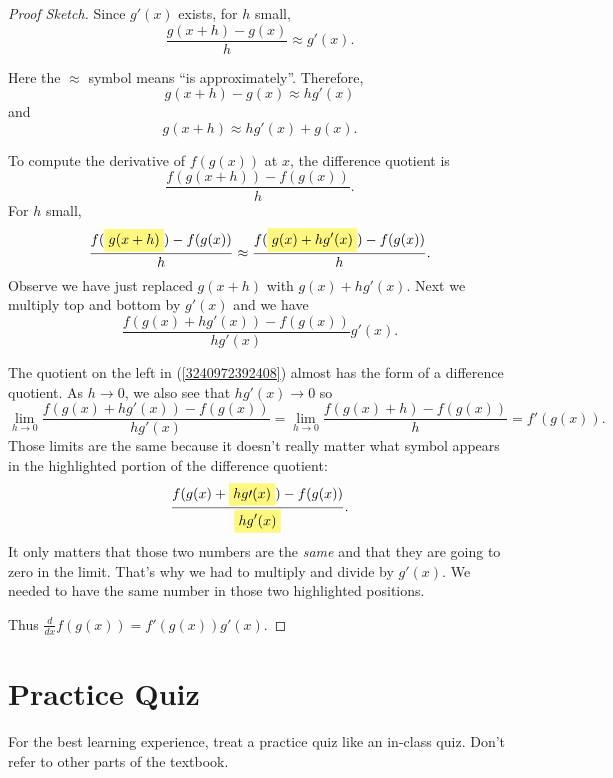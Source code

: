 \documentclass[11pt]{book}
\newcommand{\highlight}[1]{%
  \colorbox{yellow!50}{$\displaystyle#1$}}
\numberwithin{example}{chapter}
\begin{document}
\begin{proof}[Proof Sketch]

Since $g'(x)$ exists, for $h$ small, 
$$\frac{g(x+h)-g(x)}{h}\approx g'(x).$$

Here the $\approx$ symbol means ``is approximately''.  Therefore, 
$$g(x+h)-g(x)\approx hg'(x)$$
and 
$$g(x+h)\approx hg'(x)+g(x).$$

To compute the derivative of $f(g(x))$ at $x$, the difference quotient is $$\frac{f(g(x+h))-f(g(x))}{h}.$$
For $h$ small, 
$$ 
\frac{f(\highlight{g(x+h)})-f(g(x))}{h} \approx \frac{f(\highlight{g(x) + hg'(x)})-f(g(x))}{h}.$$
Observe we have just replaced $g(x+h)$ with $g(x) + hg'(x)$.  Next we multiply top and bottom by $g'(x)$ and we have 
\begin{equation} \label{3240972392408}
\frac{f(g(x) + hg'(x))-f(g(x))}{hg'(x)} g'(x).
\end{equation}

The quotient on the left in  (\ref{3240972392408}) almost has the form of a difference quotient.  As $h\to 0$, we also see that $hg'(x)\to 0$ so 
$$\lim_{h\to 0} \frac{f(g(x) + hg'(x))-f(g(x))}{hg'(x)}  = \lim_{h\to 0} \frac{f(g(x) + h)-f(g(x))}{h} = f'(g(x)).$$
Those limits are the same because it doesn't really matter what symbol appears in the highlighted portion of the difference quotient: 
$$\frac{f(g(x) + \highlight{hg\prime(x)})-f(g(x))}{\highlight{hg'(x)}}.$$
It only matters that those two numbers are the \emph{same} and that they are going to zero in the limit.  That's why we had to multiply and divide by $g'(x)$.  We needed to have the same number in those two highlighted positions.  

Thus $\frac{d}{dx}f(g(x)) = f'(g(x))g'(x)$.
\end{proof}



\section{Practice Quiz}

For the best learning experience, treat a practice quiz like an in-class quiz. Don't refer to other parts of the textbook.
\end{document}
